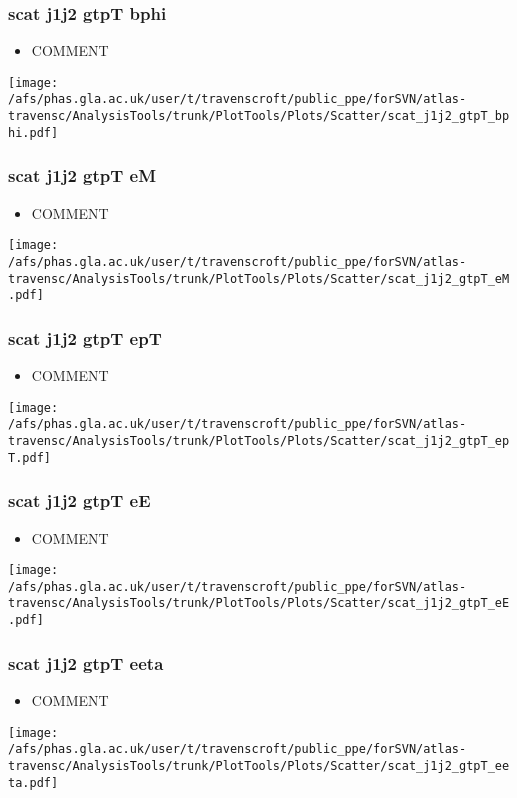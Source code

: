 \documentclass{beamer}
\begin{document}
\begin{frame}
\frametitle{scat j1j2 gtpT bphi}
\begin{itemize}
\item COMMENT
\end{itemize}
\begin{center}
\texttt{[image: /afs/phas.gla.ac.uk/user/t/travenscroft/public\_ppe/forSVN/atlas-travensc/AnalysisTools/trunk/PlotTools/Plots/Scatter/scat\_j1j2\_gtpT\_bphi.pdf]}
\end{center}
\end{frame}

\begin{frame}
\frametitle{scat j1j2 gtpT eM}
\begin{itemize}
\item COMMENT
\end{itemize}
\begin{center}
\texttt{[image: /afs/phas.gla.ac.uk/user/t/travenscroft/public\_ppe/forSVN/atlas-travensc/AnalysisTools/trunk/PlotTools/Plots/Scatter/scat\_j1j2\_gtpT\_eM.pdf]}
\end{center}
\end{frame}

\begin{frame}
\frametitle{scat j1j2 gtpT epT}
\begin{itemize}
\item COMMENT
\end{itemize}
\begin{center}
\texttt{[image: /afs/phas.gla.ac.uk/user/t/travenscroft/public\_ppe/forSVN/atlas-travensc/AnalysisTools/trunk/PlotTools/Plots/Scatter/scat\_j1j2\_gtpT\_epT.pdf]}
\end{center}
\end{frame}

\begin{frame}
\frametitle{scat j1j2 gtpT eE}
\begin{itemize}
\item COMMENT
\end{itemize}
\begin{center}
\texttt{[image: /afs/phas.gla.ac.uk/user/t/travenscroft/public\_ppe/forSVN/atlas-travensc/AnalysisTools/trunk/PlotTools/Plots/Scatter/scat\_j1j2\_gtpT\_eE.pdf]}
\end{center}
\end{frame}

\begin{frame}
\frametitle{scat j1j2 gtpT eeta}
\begin{itemize}
\item COMMENT
\end{itemize}
\begin{center}
\texttt{[image: /afs/phas.gla.ac.uk/user/t/travenscroft/public\_ppe/forSVN/atlas-travensc/AnalysisTools/trunk/PlotTools/Plots/Scatter/scat\_j1j2\_gtpT\_eeta.pdf]}
\end{center}
\end{frame}
\end{document}
